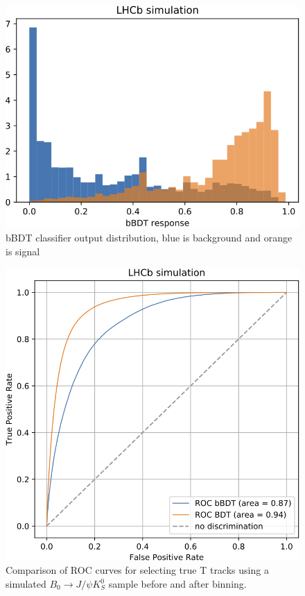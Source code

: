 \begin{figure}
\centering
\hspace*{-1cm}\includegraphics[scale=0.6]{figures/bbdt_response.png}
\caption{bBDT classifier output distribution, blue is background and orange is signal }
\label{fig:bbdt response}
\end{figure}


\begin{figure}
\centering
\hspace*{-1cm}\includegraphics[scale=0.6]{figures/bBDT_roc.png}
\caption{Comparison of ROC curves for selecting true T tracks using a simulated $B_0\rightarrow J/\psi K_S^0 $ sample before and after binning.}
\label{fig:ROC binned}
\end{figure}


